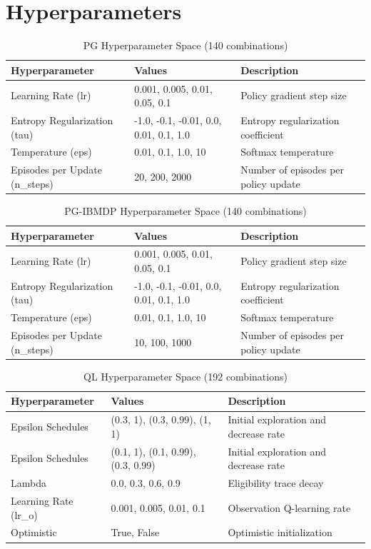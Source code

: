 \section{Hyperparameters}\label{sec:hp-pomdp}
\begin{table}
\small
\centering
\caption{PG Hyperparameter Space (140 combinations)}
\begin{tabular}{lll}
\toprule
\textbf{Hyperparameter} & \textbf{Values} & \textbf{Description} \\
\midrule
Learning Rate (lr) & 0.001, 0.005, 0.01, 0.05, 0.1 & Policy gradient step size \\
Entropy Regularization (tau) & -1.0, -0.1, -0.01, 0.0, 0.01, 0.1, 1.0 & Entropy regularization coefficient \\
Temperature (eps) & 0.01, 0.1, 1.0, 10 & Softmax temperature \\
Episodes per Update (n\_steps) & 20, 200, 2000 & Number of episodes per policy update \\
\bottomrule
\end{tabular}
\end{table}

\begin{table}
\small
\centering
\caption{PG-IBMDP Hyperparameter Space (140 combinations)}
\begin{tabular}{lll}
\toprule
\textbf{Hyperparameter} & \textbf{Values} & \textbf{Description} \\
\midrule
Learning Rate (lr) & 0.001, 0.005, 0.01, 0.05, 0.1 & Policy gradient step size \\
Entropy Regularization (tau) & -1.0, -0.1, -0.01, 0.0, 0.01, 0.1, 1.0 & Entropy regularization coefficient \\
Temperature (eps) & 0.01, 0.1, 1.0, 10 & Softmax temperature \\
Episodes per Update (n\_steps) & 10, 100, 1000 & Number of episodes per policy update \\
\bottomrule
\end{tabular}
\end{table}


\begin{table}
\small
\centering
\caption{QL Hyperparameter Space (192 combinations)}
\begin{tabular}{lll}
\toprule
\textbf{Hyperparameter} & \textbf{Values} & \textbf{Description} \\
\midrule
Epsilon Schedules & (0.3, 1), (0.3, 0.99), (1, 1) & Initial exploration and decrease rate \\
Epsilon Schedules & (0.1, 1), (0.1, 0.99), (0.3, 0.99) & Initial exploration and decrease rate \\
Lambda & 0.0, 0.3, 0.6, 0.9 & Eligibility trace decay \\
Learning Rate (lr\_o) & 0.001, 0.005, 0.01, 0.1 & Observation Q-learning rate \\
Optimistic & True, False & Optimistic initialization \\
\bottomrule
\end{tabular}
\end{table}

